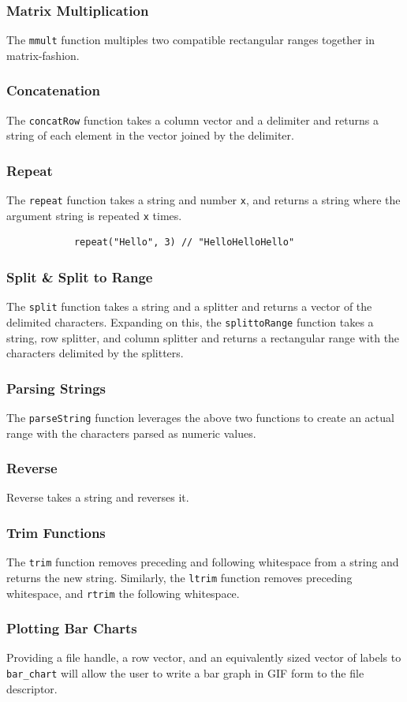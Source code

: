 		\subsubsection{Matrix Multiplication}
		The \texttt{mmult} function multiples two compatible rectangular ranges together in matrix-fashion.

		\subsubsection{Concatenation}
		The \texttt{concatRow} function takes a column vector and a delimiter and returns a string of each element in the vector joined by the delimiter.

		\subsubsection{Repeat}
		The \texttt{repeat} function takes a string and number \texttt{x}, and returns a string where the argument string is repeated \texttt{x} times.
		\begin{lstlisting}
			repeat("Hello", 3) // "HelloHelloHello"
		\end{lstlisting}

		\subsubsection{Split \& Split to Range}
		The \texttt{split} function takes a string and a splitter and returns a vector of the delimited characters. Expanding on this, the \texttt{splittoRange} function takes a string, row splitter, and column splitter and returns a rectangular range with the characters delimited by the splitters.

		\subsubsection{Parsing Strings}
		The \texttt{parseString} function leverages the above two functions to create an actual range with the characters parsed as numeric values.

		\subsubsection{Reverse}
		Reverse takes a string and reverses it.

		\subsubsection{Trim Functions}
		The \texttt{trim} function removes preceding and following whitespace from a string and returns the new string. Similarly, the \texttt{ltrim} function removes preceding whitespace, and \texttt{rtrim} the following whitespace.

		\subsubsection{Plotting Bar Charts}
		Providing a file handle, a row vector, and an equivalently sized vector of labels to \texttt{bar\_chart} will allow the user to write a bar graph in GIF form to the file descriptor.
